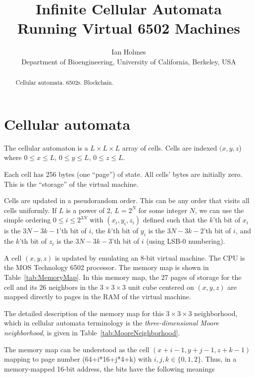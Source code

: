 \documentclass{article}
\begin{document}
\title{Infinite Cellular Automata Running Virtual 6502 Machines}
\author{Ian Holmes \\ Department of Bioengineering, University of California, Berkeley, USA}

\maketitle


\begin{abstract}
  Cellular automata.
  6502s.
  Blockchain.
\end{abstract}

\section{Cellular automata}

The cellular automaton is a $L \times L \times L$ array of cells.
Cells are indexed $(x,y,z$) where $0 \leq x \leq L$, $0 \leq y \leq L$, $0 \leq z \leq L$.

Each cell has 256 bytes (one ``page'') of state.
All cells' bytes are initially zero.
This is the ``storage'' of the virtual machine.

Cells are updated in a pseudorandom order.
This can be any order that visits all cells uniformly.
If $L$ is a power of 2, $L = 2^N$ for some integer $N$,
we can use the simple ordering $0 \leq i \leq 2^{3N}$
with $(x_i,y_i,z_i)$ defined such that
the $k$'th bit of $x_i$ is the $3N-3k-1$'th bit of $i$,
the $k$'th bit of $y_i$ is the $3N-3k-2$'th bit of $i$, and
the $k$'th bit of $z_i$ is the $3N-3k-3$'th bit of $i$
(using LSB-0 numbering).

A cell $(x,y,z)$ is updated by emulating an 8-bit virtual machine.
The CPU is the MOS Technology 6502 processor.
The memory map is shown in Table~\ref{tab:MemoryMap}.
In this memory map, the 27 pages of storage
for the cell and its 26 neighbors
in the $3 \times 3 \times 3$ unit cube centered on $(x,y,z)$
are mapped directly to pages in the RAM of the virtual machine.

The detailed description of the memory map for this $3 \times 3 \times 3$ neighborhood,
which in cellular automata terminology is
the {\em three-dimensional Moore neighborhood},
is given in Table~\ref{tab:MooreNeighborhood}.

The memory map can be understood as the cell $(x+i-1,y+j-1,z+k-1)$
mapping to page number (64+i*16+j*4+k) with $i,j,k \in \{0,1,2\}$.
Thus, in a memory-mapped 16-bit address, the bits have the following meanings
\end{document}
